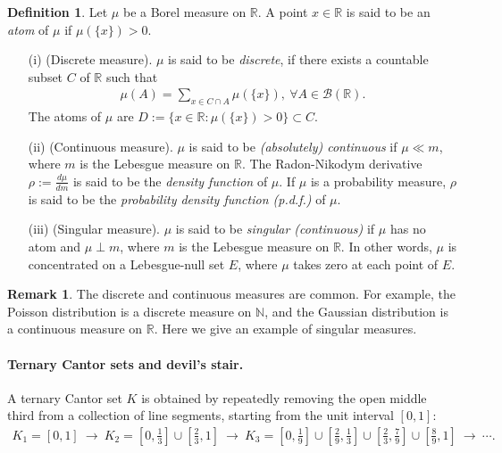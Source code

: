 \documentclass{article}
\numberwithin{equation}{section}
\theoremstyle{plain}
\theoremstyle{definition}
\newtheorem{definition}[theorem]{Definition}
\newtheorem*{remark}{Remark}
\begin{document}
\begin{definition}\label{def:2.4} Let $\mu$ be a Borel measure on $\mathbb{R}$. A point $x\in\mathbb{R}$ is said to be an \textit{atom} of $\mu$ if $\mu(\{x\})>0$.
\begin{itemize}
\item[(i)] (Discrete measure). $\mu$ is said to be \textit{discrete}, if there exists a countable subset $C$ of $\mathbb{R}$ such that
\begin{align*}
	\mu(A) = \sum_{x\in C\cap A}\mu(\{x\}),\ \forall A\in\mathscr{B}(\mathbb{R}).
\end{align*}
The atoms of $\mu$ are $D:=\{x\in\mathbb{R}:\mu(\{x\})>0\}\subset C$.
\item[(ii)] (Continuous measure). $\mu$ is said to be \textit{(absolutely) continuous} if $\mu\ll m$, where $m$ is the Lebesgue measure on $\mathbb{R}$. The Radon-Nikodym derivative $\rho:=\frac{d\mu}{dm}$ is said to be the \textit{density function} of $\mu$. If $\mu$ is a probability measure, $\rho$ is said to be the \textit{probability density function (p.d.f.)} of $\mu$.
\item[(iii)] (Singular measure). $\mu$ is said to be \textit{singular (continuous)} if $\mu$ has no atom and $\mu\perp m$, where $m$ is the Lebesgue measure on $\mathbb{R}$. In other words, $\mu$ is concentrated on a Lebesgue-null set $E$, where $\mu$ takes zero at each point of $E$.
\end{itemize}
\end{definition}
\begin{remark} The discrete and continuous measures are common. For example, the Poisson distribution is a discrete measure on $\mathbb{N}$, and the Gaussian distribution is a continuous measure on $\mathbb{R}$. Here we give an example of singular measures.
\end{remark}

\paragraph{Ternary Cantor sets and devil's stair.} A ternary Cantor set $K$ is obtained by repeatedly removing the open middle third from a collection of line segments, starting from the unit interval $[0,1]$:
\begin{align*}
	K_1=[0,1]\ \to\  K_2=\left[0,\frac{1}{3}\right]\cup\left[\frac{2}{3},1\right]\ \to\  K_3=\left[0,\frac{1}{9}\right]\cup\left[\frac{2}{9},\frac{1}{3}\right]\cup\left[\frac{2}{3},\frac{7}{9}\right]\cup\left[\frac{8}{9},1\right]\ \to\ \cdots.
\end{align*}
\end{document}
